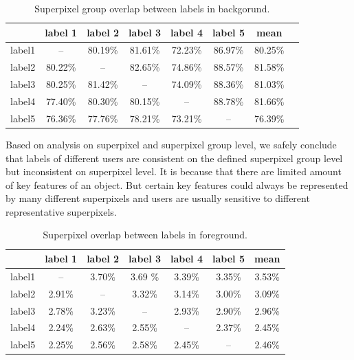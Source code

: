 \documentclass[runningheads,a4paper]{llncs}
\begin{document}
\begin{table}[!tb]
\caption{Superpixel group overlap between labels in backgorund.}
\centering
\begin{tabular}{|c|c|c|c|c|c|c|c|}
\hline
 & label 1 & label 2&label 3&label 4&label 5&mean\\
\hline
label1& -- &80.19\% & 81.61\%& 72.23\%& 86.97\%&80.25\%\\
\hline
label2& 80.22\% & -- & 82.65\%& 74.86\%& 88.57\%&81.58\% \\
\hline
label3& 80.25\% & 81.42\% & -- & 74.09\%& 88.36\%&81.03\%\\
\hline
label4& 77.40\% & 80.30\% & 80.15\%& -- & 88.78\%&81.66\% \\
\hline
label5& 76.36\% & 77.76\% & 78.21\%& 73.21\%& -- &76.39\%\\
\hline
\end{tabular}
\label{ta:group overlap b}
\end{table}

Based on analysis on superpixel and superpixel group level, we safely conclude that labels of different users are consistent on the defined superpixel group level but inconsistent on superpixel level. It is because that there are limited amount of key features of an object. But certain key features could always be represented by many different superpixels and users are usually sensitive to different representative superpixels.
\begin{table}[!tb]
\centering
\caption{Superpixel overlap between labels in foreground.}
\begin{tabular}{|c|c|c|c|c|c|c|}
\hline
 & label 1 & label 2&label 3&label 4&label 5&mean\\
\hline
label1& -- & 3.70\% & 3.69	\%& 3.39\%& 3.35\%& 3.53\%\\
\hline
label2& 2.91\% & -- & 3.32\%& 3.14\%& 3.00\% & 3.09\%\\
\hline
label3& 2.78\% & 3.23\% & -- & 2.93\%& 2.90\%& 2.96\% \\
\hline
label4& 2.24\% & 2.63\% & 2.55\%& -- & 2.37\%& 2.45\%\\
\hline
label5& 2.25\% & 2.56\% & 2.58\%& 2.45\%& -- & 2.46\% \\
\hline
\end{tabular}
\label{ta: sp overlap f}
\end{table}
\end{document}
